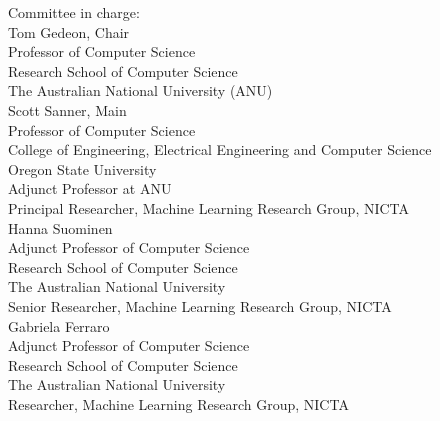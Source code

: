 \noindent
{\Huge{Committee in charge:} }\\[.4cm]
{\LARGE  Tom Gedeon, Chair } \\[.1cm]
{Professor of Computer Science\\
Research School of Computer Science\\
The Australian National University (ANU)
 }\\[.2cm]
{\LARGE  Scott Sanner, Main } \\[.1cm]
{Professor of Computer Science\\
College of Engineering,
Electrical Engineering and Computer Science\\
Oregon State University\\
Adjunct Professor at ANU\\
Principal Researcher, Machine Learning Research Group, NICTA
 }\\[.2cm]
{\LARGE  Hanna Suominen } \\[.1cm]
{Adjunct Professor of Computer Science\\
Research School of Computer Science\\
The Australian National University\\
Senior Researcher, Machine Learning Research Group, NICTA
}\\[.2cm]
{\LARGE  Gabriela Ferraro } \\[.1cm]
{Adjunct Professor of Computer Science\\
Research School of Computer Science\\
The Australian National University\\
Researcher, Machine Learning Research Group, NICTA
}\\[.2cm]



\newpage
%
%
%
